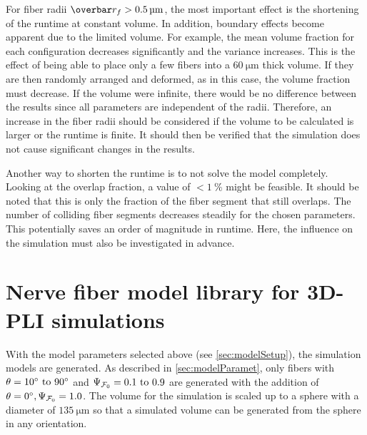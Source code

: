 %
For fiber radii $\fiberRadiusMean > \SI{0.5}{\micro\meter}$, the most important effect is the shortening of the runtime at constant volume.
In addition, boundary effects become apparent due to the limited volume.
For example, the mean volume fraction for each configuration decreases significantly and the variance increases.
This is the effect of being able to place only a few fibers into a $\SI{60}{\micro\meter}$ thick volume.
If they are then randomly arranged and deformed, as in this case, the volume fraction must decrease.
If the volume were infinite, there would be no difference between the results since all parameters are independent of the radii.
Therefore, an increase in the fiber radii should be considered if the volume to be calculated is larger or the runtime is finite.
It should then be verified that the simulation does not cause significant changes in the results.
\par
%
Another way to shorten the runtime is to not solve the model completely.
Looking at the overlap fraction, a value of $<\SI{1}{\percent}$ might be feasible.
It should be noted that this is only the fraction of the fiber segment that still overlaps.
The number of colliding fiber segments decreases steadily for the chosen parameters.
This potentially saves an order of magnitude in runtime.
Here, the influence on the simulation must also be investigated in advance.
% 
%
%
\section{Nerve fiber model library for \acs{3D-PLI} simulations}
\label{sec:genNerveFiberLibrary}
%
With the model parameters selected above (see \cref{sec:modelSetup}), the simulation models are generated.
As described in \cref{sec:modelParamet}, only fibers with $\modelOmega = \SIrange{10}{90}{\degree}$ and $\modelPsi = \SIrange{0.1}{0.9}{}$ are generated with the addition of $\textnormal{$\theta$}=\SI{0}{\degree}, \textnormal{$\Psi_{\textnormal{$\mathcal{F}_0$}}$}=\SI{1.0}{}$.
The volume for the simulation is scaled up to a sphere with a diameter of $\SI{135}{\micro\meter}$ so that a simulated volume can be generated from the sphere in any orientation.
% 
%
%
